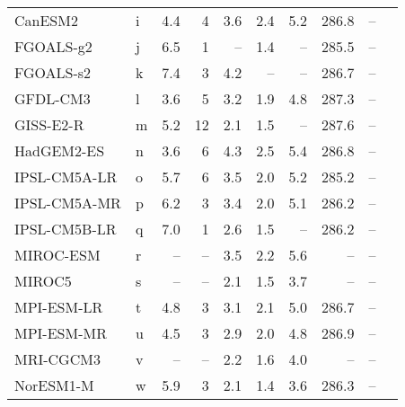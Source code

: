 \begin{table}
\begin{tabular}{llrrrrrrrl}
CanESM2       &   i &   4.4 &                       4 &  3.6 &  2.4 &   5.2 &  286.8 &                   -- &     \citet{gregory15tcr} \\
FGOALS-g2     &   j &   6.5 &                       1 &   -- &  1.4 &    -- &  285.5 &                   -- &  \citet{stocker2013ipcc} \\
FGOALS-s2     &   k &   7.4 &                       3 &  4.2 &   -- &    -- &  286.7 &                   -- &  \citet{Zelinka2020sens} \\
GFDL-CM3      &   l &   3.6 &                       5 &  3.2 &  1.9 &   4.8 &  287.3 &                   -- &     \citet{gregory15tcr} \\
GISS-E2-R     &   m &   5.2 &                      12 &  2.1 &  1.5 &    -- &  287.6 &                   -- &  \citet{stocker2013ipcc} \\
HadGEM2-ES    &   n &   3.6 &                       6 &  4.3 &  2.5 &   5.4 &  286.8 &                   -- &     \citet{gregory15tcr} \\
IPSL-CM5A-LR  &   o &   5.7 &                       6 &  3.5 &  2.0 &   5.2 &  285.2 &                   -- &     \citet{gregory15tcr} \\
IPSL-CM5A-MR  &   p &   6.2 &                       3 &  3.4 &  2.0 &   5.1 &  286.2 &                   -- &     \citet{gregory15tcr} \\
IPSL-CM5B-LR  &   q &   7.0 &                       1 &  2.6 &  1.5 &    -- &  286.2 &                   -- &  \citet{stocker2013ipcc} \\
MIROC-ESM     &   r &    -- &                    -- &  3.5 &  2.2 &   5.6 &     -- &                   -- &     \citet{gregory15tcr} \\
MIROC5        &   s &    -- &                    -- &  2.1 &  1.5 &   3.7 &     -- &                   -- &     \citet{gregory15tcr} \\
MPI-ESM-LR    &   t &   4.8 &                       3 &  3.1 &  2.1 &   5.0 &  286.7 &                   -- &     \citet{gregory15tcr} \\
MPI-ESM-MR    &   u &   4.5 &                       3 &  2.9 &  2.0 &   4.8 &  286.9 &                   -- &     \citet{gregory15tcr} \\
MRI-CGCM3     &   v &    -- &                    -- &  2.2 &  1.6 &   4.0 &     -- &                   -- &     \citet{gregory15tcr} \\
NorESM1-M     &   w &   5.9 &                       3 &  2.1 &  1.4 &   3.6 &  286.3 &                   -- &     \citet{gregory15tcr} \\

\end{tabular}
\end{table}
